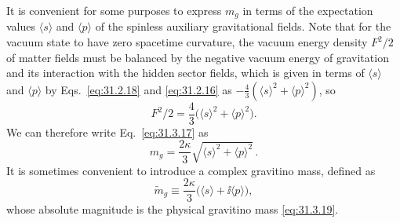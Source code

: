 It is convenient for some purposes to express \(m_g\) in terms of the
expectation values \(\langle s\rangle\) and \(\langle p\rangle\) of the
spinless auxiliary gravitational fields. Note that for the vacuum state
to have zero spacetime curvature, the vacuum energy density \(F^2/2\) of
matter fields must be balanced by the negative vacuum energy of
gravitation and its interaction with the hidden sector fields, which is
given in terms of \(\langle s\rangle\) and \(\langle p\rangle\) by
Eqs.~\eqref{eq:31.2.18} and \eqref{eq:31.2.16} as
\(-\frac43(\langle s\rangle^2+\langle p\rangle^2)\), so
\begin{equation}
  F^2/2=\frac43\bigl(\langle s\rangle^2+\langle p\rangle^2\bigr).
  \tag{31.3.18}\label{eq:31.3.18}
\end{equation}
We can therefore write Eq.~\eqref{eq:31.3.17} as
\begin{equation}
  m_g=\frac{2\kappa}{3}
  \sqrt{\langle s\rangle^2+\langle p\rangle^2}\,.
  \tag{31.3.19}\label{eq:31.3.19}
\end{equation}
It is sometimes convenient to introduce a complex gravitino mass, defined
as
\begin{equation}
  \widetilde m_g\equiv
  \frac{2\kappa}{3}\bigl(\langle s\rangle+\ii\langle p\rangle\bigr),
  \tag{31.3.20}\label{eq:31.3.20}
\end{equation}
whose absolute magnitude is the physical gravitino mass
\eqref{eq:31.3.19}.
